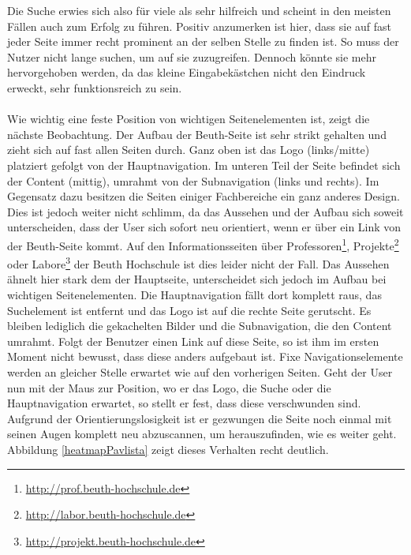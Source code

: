 Die Suche erwies sich also für viele als sehr hilfreich und scheint in den meisten Fällen auch zum Erfolg zu führen. Positiv anzumerken ist hier, dass sie auf fast jeder Seite immer recht prominent an der selben Stelle zu finden ist. So muss der Nutzer nicht lange suchen, um auf sie zuzugreifen. Dennoch könnte sie mehr hervorgehoben werden, da das kleine Eingabekästchen nicht den Eindruck erweckt, sehr funktionsreich zu sein.\\
\\
Wie wichtig eine feste Position von wichtigen Seitenelementen ist, zeigt die nächste Beobachtung. Der Aufbau der Beuth-Seite ist sehr strikt gehalten und zieht sich auf fast allen Seiten durch. Ganz oben ist das Logo (links/mitte) platziert gefolgt von der Hauptnavigation. Im unteren Teil der Seite befindet sich der Content (mittig), umrahmt von der Subnavigation (links und rechts). Im Gegensatz dazu besitzen die Seiten einiger Fachbereiche ein ganz anderes Design. Dies ist jedoch weiter nicht schlimm, da das Aussehen und der Aufbau sich soweit unterscheiden, dass der User sich sofort neu orientiert, wenn er über ein Link von der Beuth-Seite kommt. Auf den Informationsseiten über Professoren\footnote{\url{http://prof.beuth-hochschule.de}}, Projekte\footnote{\url{http://labor.beuth-hochschule.de}} oder Labore\footnote{\url{http://projekt.beuth-hochschule.de}} der Beuth Hochschule ist dies leider nicht der Fall. Das Aussehen ähnelt hier stark dem der Hauptseite, unterscheidet sich jedoch im Aufbau bei wichtigen Seitenelementen. Die Hauptnavigation fällt dort komplett raus, das Suchelement ist entfernt und das Logo ist auf die rechte Seite gerutscht. Es bleiben lediglich die gekachelten Bilder und die Subnavigation, die den Content umrahmt. Folgt der Benutzer einen Link auf diese Seite, so ist ihm im ersten Moment nicht bewusst, dass diese anders aufgebaut ist. Fixe Navigationselemente werden an gleicher Stelle erwartet wie auf den vorherigen Seiten. Geht der User nun mit der Maus zur Position, wo er das Logo, die Suche oder die Hauptnavigation erwartet, so stellt er fest, dass diese verschwunden sind. Aufgrund der Orientierungslosigkeit ist er gezwungen die Seite noch einmal mit seinen Augen komplett neu abzuscannen, um herauszufinden, wie es weiter geht. Abbildung \ref{heatmapPavlista} zeigt dieses Verhalten recht deutlich.

